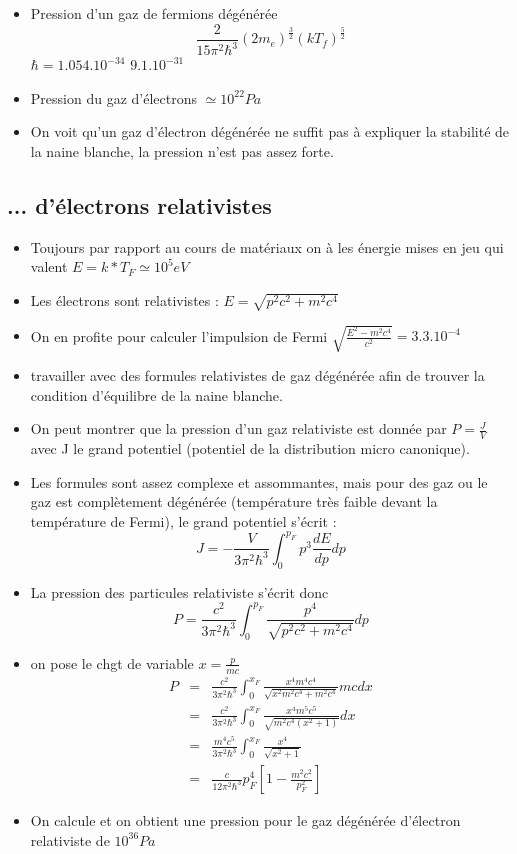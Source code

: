\documentclass[11pt]{book} %
\begin{document}
\begin{itemize}
  \item Pression d'un gaz de fermions dégénérée $$\frac{2}{15\pi^2\hbar^3}(2m_e)^{\frac{3}{2}}(kT_f)^{\frac{5}{2}}$$
  $\hbar = 1.054.10^{-34}$
  $9.1.10^{-31}$
  \item Pression du gaz d'électrons $\simeq \boxed{10^{22} Pa}$
  \item On voit qu'un gaz d'électron dégénérée ne suffit pas à expliquer la stabilité de la naine blanche, la pression n'est pas assez forte.
\end{itemize}

\subsection{... d'électrons relativistes}
\begin{itemize}
  \item Toujours par rapport au cours de matériaux on à les énergie mises en jeu qui valent $E = k*T_F \simeq \boxed{10^5 eV}$
  \item Les électrons sont relativistes : $E = \sqrt{p^2c^2 + m^2c^4}$
  \item On en profite pour calculer l'impulsion de Fermi $ \sqrt{\frac{E^2 - m^2c^4}{c^2}} = 3.3.10^{-4}$
  \item travailler avec des formules relativistes de gaz dégénérée afin de trouver la condition d'équilibre de la naine blanche.
\end{itemize}
\n
\begin{itemize}
  \item On peut montrer que la pression d'un gaz relativiste est donnée par $P = \frac{J}{V}$ avec J le grand potentiel (potentiel de la distribution micro canonique).
  \item Les formules sont assez complexe et assommantes, mais pour des gaz ou le gaz est complètement dégénérée (température très faible devant la température de Fermi), le grand potentiel s'écrit :
  $$J = - \frac{V}{3\pi^2\hbar^3}\int_0^{p_F} p^3 \frac{dE}{dp} dp$$
  \item La pression des particules relativiste s'écrit donc $$P = \frac{c^2}{3\pi^2\hbar^3}\int_0^{p_F} \frac{p^4}{\sqrt{p^2c^2 + m^2c^4}} dp $$
  \item on pose le chgt de variable $x = \frac{p}{mc}$
  \begin{eqnarray*}
    P &=& \frac{c^2}{3\pi^2\hbar^3}\int_0^{x_F} \frac{x^4 m^4 c^4}{\sqrt{x^2 m^2 c^4 + m^2c^4}}mcdx\\
    &=&\frac{c^2}{3\pi^2\hbar^3}\int_0^{x_F}\frac{x^4m^5c^5}{\sqrt{m^2c^4(x^2 + 1)}}dx\\
    &=&\frac{m^4c^5}{3\pi^2\hbar^3}\int_0^{x_F} \frac{x^4}{\sqrt{x^2 + 1}}\\
    &=& \boxed{\frac{c}{12\pi^2 \hbar^3}p_F^4\left[1 - \frac{m^2 c^2}{p_F^2}\right]}
  \end{eqnarray*}
  \item On calcule et on obtient une pression pour le gaz dégénérée d'électron relativiste de $\boxed{10^{36}Pa}$

\end{itemize}
\end{document}

